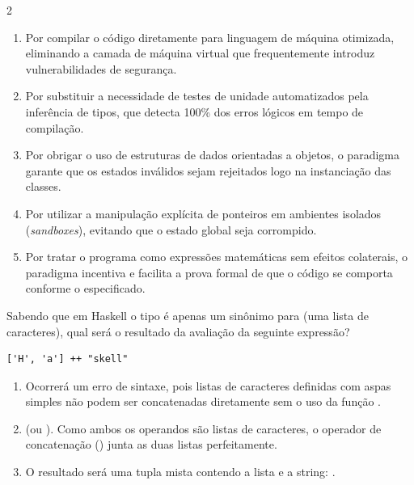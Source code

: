 \documentclass[a4paper,10pt,brazil]{article}
\begin{document}
\begin{multicols}{2}
\begin{enumerate}
  \item Por compilar o código diretamente para linguagem de máquina otimizada, eliminando a camada de máquina virtual que frequentemente introduz vulnerabilidades de segurança.

  \item Por substituir a necessidade de testes de unidade automatizados pela inferência de tipos, que detecta 100\% dos erros lógicos em tempo de compilação.

  \item Por obrigar o uso de estruturas de dados orientadas a objetos, o paradigma garante que os estados inválidos sejam rejeitados logo na instanciação das classes.

  \item Por utilizar a manipulação explícita de ponteiros em ambientes isolados (\emph{sandboxes}), evitando que o estado global seja corrompido.

  \item Por tratar o programa como expressões matemáticas sem efeitos colaterais, o paradigma incentiva e facilita a prova formal de que o código se comporta conforme o especificado.


\end{enumerate}

Sabendo que em Haskell o tipo  é apenas um sinônimo para \haskellinline{[Char]} (uma lista de caracteres), qual será o resultado da avaliação da seguinte expressão?
\begin{verbatim}
['H', 'a'] ++ "skell"
\end{verbatim}

\begin{enumerate}
  \item Ocorrerá um erro de sintaxe, pois listas de caracteres definidas com aspas simples não podem ser concatenadas diretamente sem o uso da função .

  \item {} (ou \haskellinline{['H', 'a', 's', 'k', 'e', 'l', 'l']}). Como ambos os operandos são listas de caracteres, o operador de concatenação (\haskellinline{++}) junta as duas listas perfeitamente.

  \item O resultado será uma tupla mista contendo a lista e a string: .


\end{enumerate}
\end{multicols}
\end{document}
